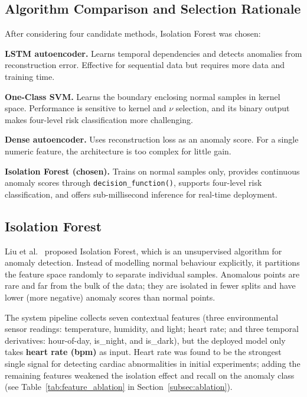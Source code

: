\subsection{Algorithm Comparison and Selection Rationale}
\label{subsec:ml_selection}

After considering four candidate methods, Isolation Forest was chosen:

\textbf{LSTM autoencoder.} Learns temporal dependencies and detects anomalies from reconstruction error. Effective for sequential data but requires more data and training time.

\textbf{One-Class SVM.} Learns the boundary enclosing normal samples in kernel space. Performance is sensitive to kernel and $\nu$ selection, and its binary output makes four-level risk classification more challenging.

\textbf{Dense autoencoder.} Uses reconstruction loss as an anomaly score. For a single numeric feature, the architecture is too complex for little gain.

\textbf{Isolation Forest (chosen).} Trains on normal samples only, provides continuous anomaly scores through \texttt{decision\_function()}, supports four-level risk classification, and offers sub-millisecond inference for real-time deployment.


\subsection{Isolation Forest}

Liu et al.~\cite{Liu2008} proposed Isolation Forest, which is an unsupervised algorithm for anomaly detection. Instead of modelling normal behaviour explicitly, it partitions the feature space randomly to separate individual samples. Anomalous points are rare and far from the bulk of the data; they are isolated in fewer splits and have lower (more negative) anomaly scores than normal points.

The system pipeline collects seven contextual features (three environmental sensor readings: temperature, humidity, and light; heart rate; and three temporal derivatives: hour-of-day, is\_night, and is\_dark), but the deployed model only takes \textbf{heart rate (bpm)} as input. Heart rate was found to be the strongest single signal for detecting cardiac abnormalities in initial experiments; adding the remaining features weakened the isolation effect and recall on the anomaly class (see Table~\ref{tab:feature_ablation} in Section~\ref{subsec:ablation}).

